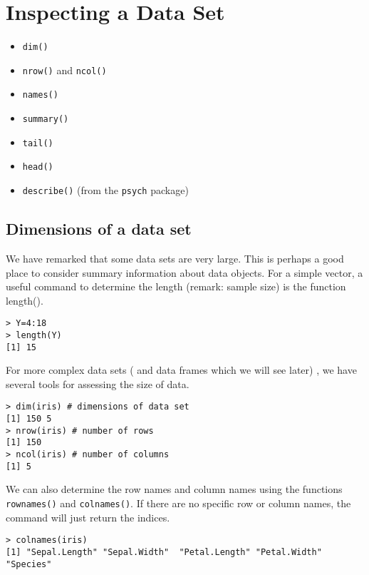 \documentclass[a4paper,12pt]{article}
\begin{document}
\section{Inspecting a Data Set}

\begin{itemize}
\item \texttt{dim()}
\item \texttt{nrow()} and \texttt{ncol()} 
\item \texttt{names()}
\item \texttt{summary()}
\item \texttt{tail()}
\item \texttt{head()}
\item \texttt{describe()} (from the \texttt{psych} package)
\end{itemize}
\subsection{Dimensions of a data set}
We have remarked that some data sets are very large. This is perhaps a good place to consider summary information about data objects.
For a simple vector,  a useful command to determine the length (remark: sample size) is the function length().

\begin{framed}
\begin{verbatim}
> Y=4:18
> length(Y)
[1] 15
\end{verbatim}
\end{framed}

For more complex data sets ( and data frames which we will see later) , we have several tools for assessing the size of data. 

\begin{framed}
\begin{verbatim}
> dim(iris) # dimensions of data set 
[1] 150 5 
> nrow(iris) # number of rows 
[1] 150 
> ncol(iris) # number of columns 
[1] 5
\end{verbatim}
\end{framed}

We can also determine the row names and column names using the functions \texttt{rownames()} and \texttt{colnames()}.
If there are no specific row or column names, the command will just return the indices. 
\begin{framed}
\begin{verbatim}
> colnames(iris)
[1] "Sepal.Length" "Sepal.Width"  "Petal.Length" "Petal.Width"  "Species" 
\end{verbatim}
\end{framed}
\end{document}
